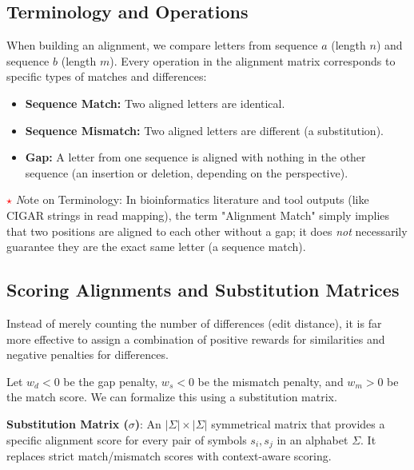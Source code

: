 \documentclass[11pt,a4paper]{article}
\newcommand{\sta}{\textcolor{red}{\textbf{\large $\star$}} \textit}
\begin{document}
\subsection{Terminology and Operations}
When building an alignment, we compare letters from sequence \( a \) (length \( n \)) and sequence \( b \) (length \( m \)). Every operation in the alignment matrix corresponds to specific types of matches and differences:

\begin{itemize}
    \item \textbf{Sequence Match:} Two aligned letters are identical.
    \item \textbf{Sequence Mismatch:} Two aligned letters are different (a substitution).
    \item \textbf{Gap:} A letter from one sequence is aligned with nothing in the other sequence (an insertion or deletion, depending on the perspective).
\end{itemize}

\sta Note on Terminology: In bioinformatics literature and tool outputs (like CIGAR strings in read mapping), the term "Alignment Match" simply implies that two positions are aligned to each other without a gap; it does \textit{not} necessarily guarantee they are the exact same letter (a sequence match).

\subsection{Scoring Alignments and Substitution Matrices}
Instead of merely counting the number of differences (edit distance), it is far more effective to assign a combination of positive rewards for similarities and negative penalties for differences. 

Let \( w_d < 0 \) be the gap penalty, \( w_s < 0 \) be the mismatch penalty, and \( w_m > 0 \) be the match score. We can formalize this using a substitution matrix.

\begin{important}
    \textbf{Substitution Matrix (\( \sigma \))}: An \( |\Sigma| \times |\Sigma| \) symmetrical matrix that provides a specific alignment score for every pair of symbols \( s_i, s_j \) in an alphabet \( \Sigma \). It replaces strict match/mismatch scores with context-aware scoring.
\end{important}
\end{document}
